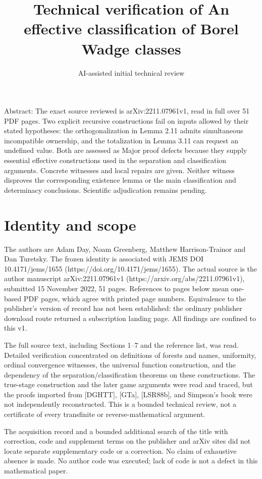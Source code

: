 \documentclass[10pt]{article}
\title{Technical verification of
An effective classification of
Borel Wadge classes}
\author{AI-assisted initial technical review}
\date{}
\begin{document}
\maketitle
Abstract: The exact source reviewed is arXiv:2211.07961v1, read in full over 51 PDF pages. Two explicit recursive constructions fail on inputs allowed by their stated hypotheses: the orthogonalization in Lemma 2.11 admits simultaneous incompatible ownership, and the totalization in Lemma 3.11 can request an undefined value. Both are assessed as Major proof defects because they supply essential effective constructions used in the separation and classification arguments. Concrete witnesses and local repairs are given. Neither witness disproves the corresponding existence lemma or the main classification and determinacy conclusions. Scientific adjudication remains pending.\par
\section*{Identity and scope}
The authors are Adam Day, Noam Greenberg, Matthew Harrison-Trainor and Dan Turetsky. The frozen identity is associated with JEMS DOI 10.4171/jems/1655 (https://doi.org/10.4171/jems/1655). The actual source is the author manuscript arXiv:2211.07961v1 (https://arxiv.org/abs/2211.07961v1), submitted 15 November 2022, 51 pages. References to pages below mean one-based PDF pages, which agree with printed page numbers. Equivalence to the publisher’s version of record has not been established: the ordinary publisher download route returned a subscription landing page. All findings are confined to this v1.\par
The full source text, including Sections 1–7 and the reference list, was read. Detailed verification concentrated on definitions of forests and names, uniformity, ordinal convergence witnesses, the universal function construction, and the dependency of the separation/classification theorems on these constructions. The true-stage construction and the later game arguments were read and traced, but the proofs imported from [DGHTT], [GTa], [LSR88b], and Simpson’s book were not independently reconstructed. This is a bounded technical review, not a certificate of every transfinite or reverse-mathematical argument.\par
The acquisition record and a bounded additional search of the title with correction, code and supplement terms on the publisher and arXiv sites did not locate separate supplementary code or a correction. No claim of exhaustive absence is made. No author code was executed; lack of code is not a defect in this mathematical paper.\par
\end{document}
